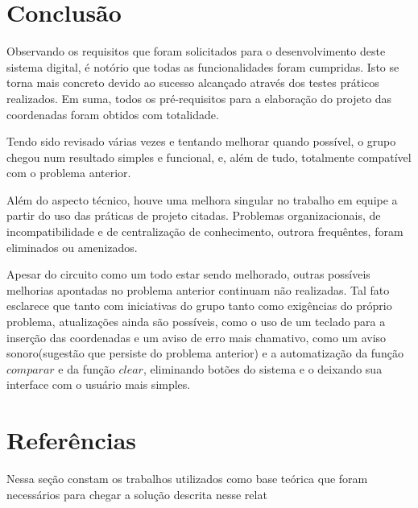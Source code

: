 \documentclass[12pt]{article}
\begin{document}
\section{Conclusão}

Observando os requisitos que foram solicitados para o desenvolvimento deste sistema digital, é notório que todas as funcionalidades foram cumpridas. Isto se torna mais concreto devido ao sucesso alcançado através dos testes práticos realizados. Em suma, todos os pré-requisitos para a elaboração do projeto das coordenadas foram obtidos com totalidade.

Tendo sido revisado várias vezes e tentando melhorar quando possível, o grupo chegou num resultado simples e funcional, e, além de tudo, totalmente compatível com o problema anterior.

Além do aspecto técnico, houve uma melhora singular no trabalho em equipe a partir do uso das práticas de projeto citadas. Problemas organizacionais, de incompatibilidade e de centralização de conhecimento, outrora frequêntes, foram eliminados ou amenizados.

Apesar do circuito como um todo estar sendo melhorado, outras possíveis melhorias apontadas no problema anterior continuam não realizadas. Tal fato esclarece que tanto com iniciativas do grupo tanto como exigências do próprio problema, atualizações ainda são possíveis, como o uso de um teclado para a inserção das coordenadas e um aviso de erro mais chamativo, como um aviso sonoro(sugestão que persiste do problema anterior) e a automatização da função $comparar$ e da função $clear$, eliminando botões do sistema e o deixando sua interface com o usuário mais simples.

\section{Referências}

Nessa seção constam os trabalhos utilizados como base teórica que foram necessários para chegar a solução descrita nesse relat




\end{document}

